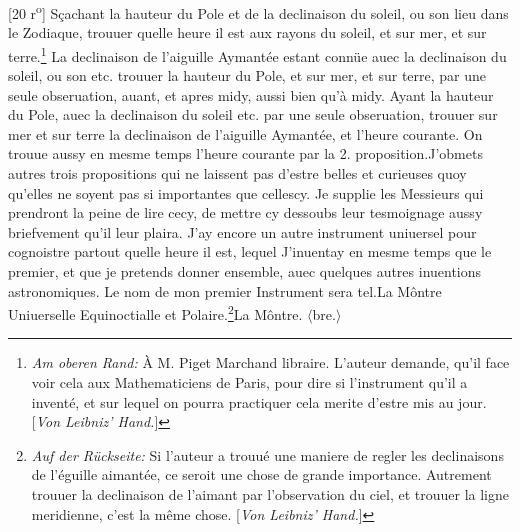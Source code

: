         \vspace*{8mm}
        \pstart 
        \normalsize
      [20 r\textsuperscript{o}]  S\c{c}achant la hauteur du Pole\protect{} et de la declinaison du soleil\protect{}, ou son lieu dans le Zodiaque\protect{}, trouuer quelle heure il est aux rayons du soleil, et sur mer\protect{}, et sur terre\protect{}.\footnote{\textit{Am oberen Rand:} \`{A} M. Piget\protect{} Marchand libraire. L'auteur demande, qu'il face voir cela aux Mathematiciens de Paris\protect{}, pour dire si l'instrument qu'il a invent\'{e}, et sur lequel on pourra practiquer cela merite d'estre mis au jour. [\textit{Von Leibniz' Hand.}]}\pend
      \pstart {} La declinaison de l'aiguille Aymant\'{e}e\protect{} estant conn\"{u}e auec la declinaison du soleil\protect{}, ou son etc. trouuer la hauteur\protect{} du Pole, et sur mer\protect{}, et sur terre\protect{}, par une seule obseruation, auant, et apres midy, aussi bien qu'\`{a} midy.\pend \pstart {} Ayant la hauteur du Pole\protect{}, auec la declinaison du soleil\protect{} etc. par une seule obseruation, trouuer sur mer\protect{} et sur terre\protect{} la declinaison de l'aiguille Aymant\'{e}e\protect{}, et l'heure courante. On trouue aussy en mesme temps l'heure courante par la 2. proposition.\pend \newpage \pstart J'obmets autres trois propositions qui ne laissent pas d'estre belles et curieuses quoy qu'elles ne soyent pas si importantes que cellescy. Je supplie les Messieurs qui prendront la peine de lire cecy, de mettre cy dessoubs leur tesmoignage aussy briefvement qu'il leur plaira. J'ay encore un autre instrument uniuersel pour cognoistre partout quelle heure il est, lequel J'inuentay en mesme temps que le premier, et que je pretends donner ensemble, auec quelques autres inuentions astronomiques. Le nom de mon premier Instrument sera tel.\pend \pstart La M\^{o}ntre\protect{} Uniuerselle Equinoctialle et Polaire.\protect{}\footnote{\textit{Auf der R\"{u}ckseite:} Si l'auteur a trouu\'{e} une maniere de regler les declinaisons de l'\'{e}guille aimant\'{e}e, ce seroit une chose de grande importance. Autrement trouuer la declinaison de l'aimant par l'observation du ciel, et trouuer la ligne meridienne, c'est la même chose. [\textit{Von Leibniz' Hand.}]}\pend \pstart La M\^{o}ntre\protect{}. $\langle$bre.$\rangle$\pend 